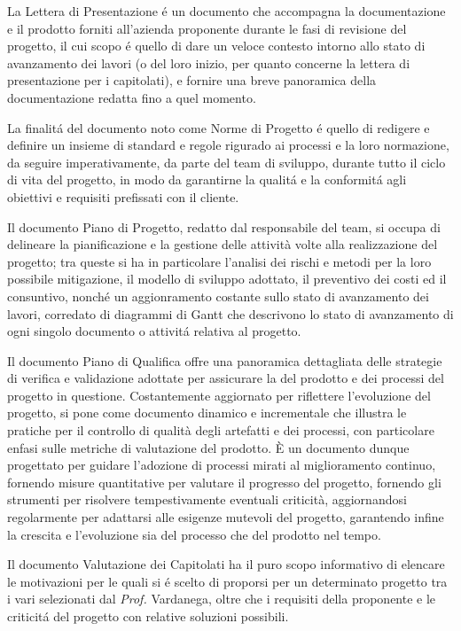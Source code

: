 La Lettera di Presentazione é un documento che accompagna la documentazione e il prodotto forniti all'azienda proponente durante le fasi di revisione del progetto, il cui scopo é quello di dare un veloce contesto intorno allo stato di avanzamento dei lavori (o del loro inizio, per quanto concerne la lettera di presentazione per i capitolati), e fornire una breve panoramica della documentazione redatta fino a quel momento. 

La finalitá del documento noto come Norme di Progetto é quello di redigere e definire un insieme di standard e regole rigurado ai processi e la loro normazione, da seguire imperativamente, da parte del team di sviluppo, durante tutto il ciclo di vita del progetto, in modo da garantirne la qualitá e la conformitá agli obiettivi e requisiti prefissati con il cliente.

Il documento Piano di Progetto, redatto dal responsabile del team, si occupa di delineare la pianificazione e la gestione delle attività volte alla realizzazione del progetto; tra queste si ha in particolare l'analisi dei rischi e metodi per la loro possibile mitigazione, il modello di sviluppo adottato, il preventivo dei costi ed il consuntivo, nonché un aggionramento costante sullo stato di avanzamento dei lavori, corredato di diagrammi di Gantt che descrivono lo stato di avanzamento di ogni singolo documento o attivitá relativa al progetto.

Il documento Piano di Qualifica offre una panoramica dettagliata delle strategie di verifica e validazione adottate per assicurare la  del prodotto e dei processi del progetto in questione. Costantemente aggiornato per riflettere l'evoluzione del progetto, si pone come documento dinamico e incrementale che illustra le pratiche per il controllo di qualità degli artefatti e dei processi, con particolare enfasi sulle metriche di valutazione del prodotto. È un documento dunque progettato per guidare l'adozione di processi mirati al miglioramento continuo, fornendo misure quantitative per valutare il progresso del progetto, fornendo gli strumenti per risolvere tempestivamente eventuali criticità, aggiornandosi regolarmente per adattarsi alle esigenze mutevoli del progetto, garantendo infine la crescita e l'evoluzione sia del processo che del prodotto nel tempo.

Il documento Valutazione dei Capitolati ha il puro scopo informativo di elencare le motivazioni per le quali si é scelto di proporsi per un determinato progetto tra i vari selezionati dal \textit{Prof.} Vardanega, oltre che i requisiti della proponente e le criticitá del progetto con relative soluzioni possibili.  

